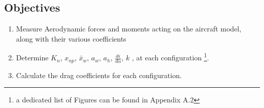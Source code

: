 \subsection{Objectives}
\begin{enumerate}
  \item Measure Aerodynamic forces  and moments acting on the aircraft model, along with their various coefficients
  \item Determine  $K_n$, $x_{np}$, $\bar{x}_w$, $a_{w}$,  $a_{h}$, $\frac{d\epsilon}{d\alpha}$, $k$ , at each configuration \footnote {a dedicated list of Figures can be found in Appendix A.2}.
  \item Calculate the drag coefficients for each configuration.
 
\end{enumerate}